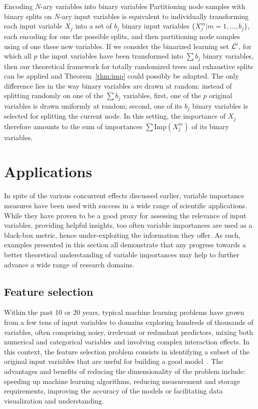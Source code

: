 \begin{remark}{Encoding $N$-ary variables into binary variables}
Partitioning node samples with binary splits on $N$-ary input variables is
equivalent to individually transforming each input variable $X_j$ into a set of
$b_j$ binary input variables $\{X_j^{m} | m=1,\dots,b_j\}$, each encoding for
one the possible splits, and then partitioning node samples using of one these new
variables. If we consider the binarized learning set ${\cal L}^\prime$, for
which all $p$ the input variables have been transformed into $\sum b_j$ binary
variables, then our theoretical framework for totally randomized trees and
exhaustive splits can be applied and Theorem~\ref{thm:imp} could possibly be
adapted. The only difference lies in the way binary variables are drawn at
random:  instead of splitting randomly on one of the $\sum b_j$ variables,
first, one of the $p$ original variables is drawn uniformly at random; second, one of
its $b_j$ binary variables is selected for splitting the current node. In this
setting, the importance of $X_j$ therefore amounts to the sum of importances $\sum
\text{Imp}(X_j^m)$ of its binary variables. \end{remark}


\section{Applications}
\label{sec:7:applications}

In spite of the various concurrent effects discussed earlier, variable importance
measures have been used with success in a wide range of scientific
applications.  While  they have proven to be a good proxy for assessing the
relevance of input variables, providing helpful insights, too often variable
importances are used as a black-box metric, hence under-exploiting the
information they offer. As such, examples presented in this section all
demonstrate that any progress towards a better theoretical understanding of
variable importances may help to further advance a wide range of research
domains.

\subsection{Feature selection}

Within the past 10 or 20 years, typical machine learning problems have
grown from a few tens of input variables to domains exploring hundreds of
thousands of variables, often comprising noisy, irrelevant or redundant
predictors, mixing both numerical and categorical variables and involving
complex interaction effects. In this context, the feature selection problem
consists in identifying a subset of the original input variables that are
useful for building a good model~\citep{guyon:2003,liu:2005}. The
advantages and benefits of reducing the dimensionality of the problem
include: speeding up machine learning algorithms, reducing measurement and
storage requirements, improving the accuracy of the models or facilitating
data visualization and understanding.

